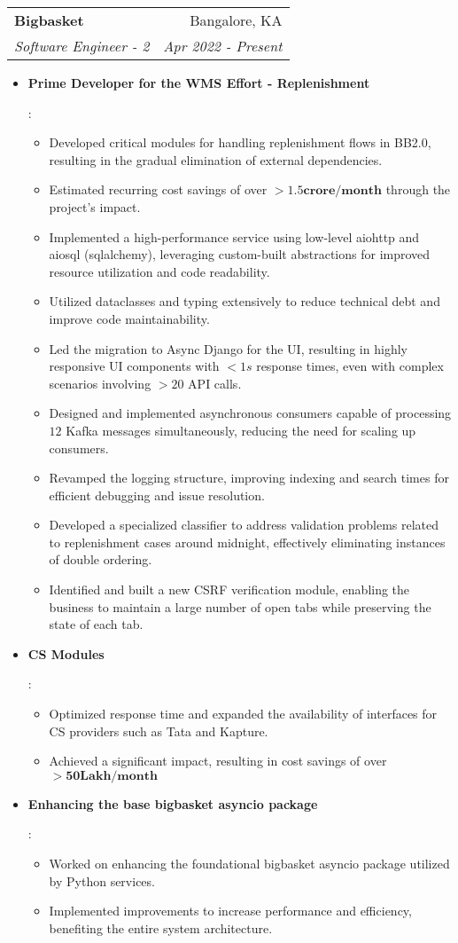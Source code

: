\documentclass[letterpaper,11pt]{article}
\makeatletter
\newcommand{\resumeItem}[2]{
  \item\small{
    \textbf{#1}{: #2 \vspace{-2pt}}
  }
}
\newcommand{\resumeSubheading}[4]{
  \vspace{-1pt}\item
    \begin{tabular*}{0.97\textwidth}[t]{l@{\extracolsep{\fill}}r}
      \textbf{#1} & #2 \\
      \textit{\small#3} & \textit{\small #4} \\
    \end{tabular*}
    \vspace{-5pt}
}
\newcommand{\resumeItemListStart}{\begin{itemize}}
\newcommand{\resumeItemListEnd}{\end{itemize}\vspace{-5pt}}
\makeatother
\begin{document}
    \resumeSubheading
      {Bigbasket}{Bangalore, KA}
      {Software Engineer - 2}{Apr 2022 - Present}
      \resumeItemListStart
        \resumeItem{Prime Developer for the WMS Effort - Replenishment}
        {
          \begin{itemize} %
            \item Developed critical modules for handling replenishment flows in BB2.0, resulting in the gradual elimination of external dependencies.
            \item Estimated recurring cost savings of over $\mathbf{>1.5 crore/month}$ through the project's impact. 
            \item Implemented a high-performance service using low-level aiohttp and aiosql (sqlalchemy), leveraging custom-built abstractions for improved resource utilization and code readability.
            \item Utilized dataclasses and typing extensively to reduce technical debt and improve code maintainability.
            \item Led the migration to Async Django for the UI, resulting in highly responsive UI components with $<1s$ response times, even with complex scenarios involving $>20$ API calls.
            \item Designed and implemented asynchronous consumers capable of processing $12$ Kafka messages simultaneously, reducing the need for scaling up consumers.
            \item Revamped the logging structure, improving indexing and search times for efficient debugging and issue resolution.
            \item Developed a specialized classifier to address validation problems related to replenishment cases around midnight, effectively eliminating instances of double ordering.
            \item Identified and built a new CSRF verification module, enabling the business to maintain a large number of open tabs while preserving the state of each tab.
          \end{itemize}
        }
        \resumeItem{CS Modules}
        {
          \begin{itemize} %
            \item Optimized response time and expanded the availability of interfaces for CS providers such as Tata and Kapture.
            \item Achieved a significant impact, resulting in cost savings of over $\mathbf{>50 Lakh/month}$
          \end{itemize}
        }
        \resumeItem{Enhancing the base bigbasket asyncio package}
        {
          \begin{itemize} %
            \item Worked on enhancing the foundational bigbasket asyncio package utilized by Python services.
            \item Implemented improvements to increase performance and efficiency, benefiting the entire system architecture.
          \end{itemize}
        }
      \resumeItemListEnd
      
\end{document}

